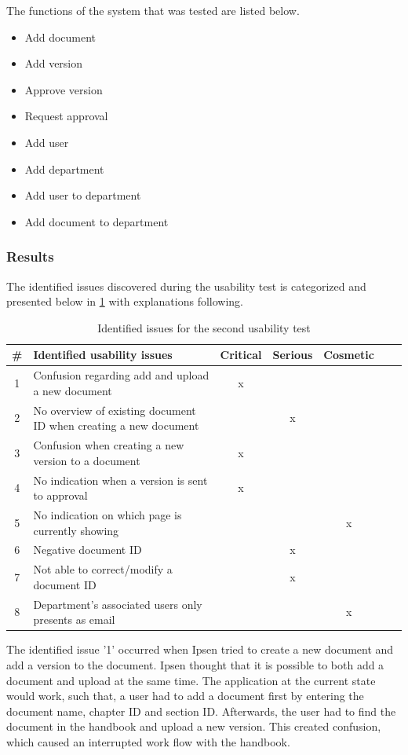 \documentclass[../../master.tex]{subfiles}
\begin{document}
The functions of the system that was tested are listed below.

\begin{itemize}
	\item Add document
	\item Add version
	\item Approve version
	\item Request approval
	\item Add user
	\item Add department
	\item Add user to department
	\item Add document to department
\end{itemize}

\subsubsection*{Results}
The identified issues discovered during the usability test is categorized and presented below in \cref{tab:utest2} with explanations following.

\begin{table}[H]
	\begin{center}
	\begin{tabular}{| c | m{21em} | c | c | c | c | c |}
		\hline
		\# & \textbf{Identified usability issues} & Critical  & Serious & Cosmetic \\
		\hline
		 1 & Confusion regarding add and upload a new document   & x &  &  \\
		\hline
		 2 & No overview of existing document ID when creating a new document &  & x & \\
		\hline
		 3 & Confusion when creating a new version to a document & x & &  \\
		\hline
		4 & No indication when a version is sent to approval & x & & \\
		\hline
		5 & No indication on which page is currently showing &  &  & x \\
		\hline
		6 & Negative document ID &  & x & \\
		\hline
		7 & Not able to correct/modify a document ID & & x &  \\
		\hline
		8 & Department's associated users only presents as email &  &  & x \\
		\hline
	\end{tabular}
	\end{center}
	\caption{Identified issues for the second usability test}\label{tab:utest2}
\end{table}
The identified issue '1' occurred when Ipsen tried to create a new document and add a version to the document.
Ipsen thought that it is possible to both add a document and upload at the same time.
The application at the current state would work, such that, a user had to add a document first by entering the document name, chapter ID and section ID.
Afterwards, the user had to find the document in the handbook and upload a new version.
This created confusion, which caused an interrupted work flow with the handbook.
\end{document}
